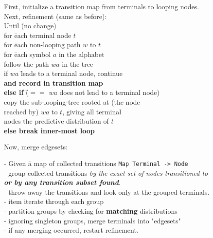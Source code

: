 \documentclass{article}
\begin{document}
\begin{leftbar}
\begin{tabbing}
  First, initialize a transition map from terminals to looping nodes.\\
  Next, refinement (same as before):\\
  Until \= (no change)\\
  \> for \= each terminal node $t$\\
  \> \> for \= each non-looping path $w$ to $t$\\
  \> \> \> for \= each symbol $a$ in the alphabet\\
  \> \> \> \> follow the path $wa$ in the tree\\
  \> \> \> \> if $wa$ \= leads to a terminal node, continue\\
  \> \> \> \> \>         {\bf and record in transition map}\\
  \> \> \> \> {\bf else if} \= ($==$ $wa$ does not lead to a terminal node)\\
  \> \> \> \> \> copy the sub-looping-tree rooted at (the node\\
  \> \> \> \> \> reached by) $wa$ to $t$, giving all terminal\\
  \> \> \> \> \> nodes the predictive distribution of $t$\\
  \> \> \> \> {\bf else break inner-most loop}
\end{tabbing}
\end{leftbar}

Now, merge edgesets:

\begin{leftbar}
\begin{tabbing}
  - Given \= a map of collected transitions \texttt{Map Terminal -> Node}\\
  \> - group collected transitions \textit{by the exact set of nodes transitioned to}\\
  \> \textit{\textbf{or by any transition subset found}}.\\
  - throw away the transitions and look only at the grouped terminals.\\
  - item iterate through each group\\
  \> - partition groups by checking for \textbf{matching} distributions\\
  - ignoring singleton groups, merge terminals into "edgesets"\\
  - if any merging occurred, restart refinement.\\
\end{tabbing}
\end{leftbar}
\end{document}
